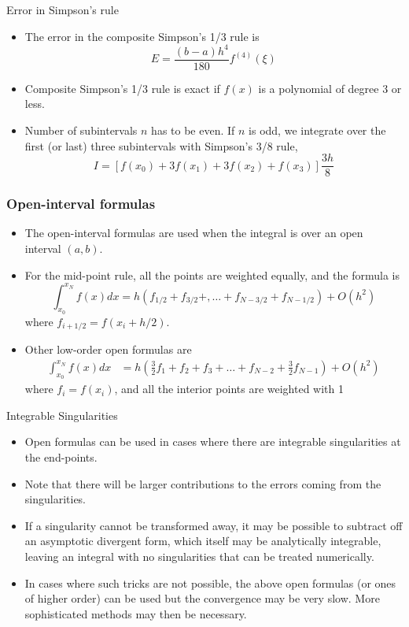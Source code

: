 \documentclass{beamer}
\newcommand{\beforeverb}{\footnotesize}
\newcommand{\afterverb}{\normalsize}
\begin{document}
\begin{frame}{Error in Simpson's rule}
\begin{itemize}
\item The error in the composite Simpson's 1/3 rule is 
\[
E=\frac{(b-a)h^4}{180} f^{(4)}(\xi)
\]
\item Composite Simpson's 1/3 rule is \alert{exact} if $f(x)$ is a polynomial of degree 3 or less.
\item Number of subintervals $n$ has to be even. If $n$ is odd, we integrate over the first (or last) three subintervals with \alert{Simpson's 3/8 rule},
\[
I=[f(x_0)+3f(x_1)+3f(x_2)+f(x_3)]\frac{3h}{8}
\] 
\end{itemize}
\end{frame}

\begin{frame}[fragile]
  \frametitle{Open-interval formulas}
  \begin{itemize}
    \item The \alert{open-interval} formulas are used when the integral is over an open interval $(a,b)$.
    \item  For the mid-point rule, all the points are weighted equally, and the formula is
    \beforeverb
    \[
    \int_{x_0}^{x_N} f(x) d x=h\left(f_{1 / 2}+f_{3 / 2}+, \ldots+f_{N-3 / 2}+f_{N-1 / 2}\right)+O\left(h^2\right)
    \]
    \afterverb
    where $f_{i+1/2}=f(x_i+h/2)$.
    \item Other low-order open formulas are
    \beforeverb
    \begin{align*}
    \int_{x_0}^{x_N} f(x) d x&=h\left(\frac{3}{2} f_1+f_2+f_3+\ldots+f_{N-2}+\frac{3}{2} f_{N-1}\right)+O\left(h^2\right) 
    \end{align*}
    \afterverb
    where $f_i=f(x_i)$, and  all the interior points are weighted with 1
    
  \end{itemize}
\end{frame}
\begin{frame}{Integrable Singularities}
  \begin{itemize}
  \item Open formulas can be used in cases where there are integrable \alert{singularities} at the end-points.
  \item Note that there will be \alert{larger contributions} to the errors coming from the singularities. 
    \item If a singularity cannot be transformed away, it may be possible to subtract off an asymptotic divergent form, which itself may be analytically integrable, leaving an integral with no singularities that can be treated numerically. 
    \item In cases where such tricks are not possible, the above open formulas (or ones of higher order) can be used but the convergence may be very slow. More sophisticated methods may then be necessary.\
  \end{itemize}
\end{frame}
\end{document}
